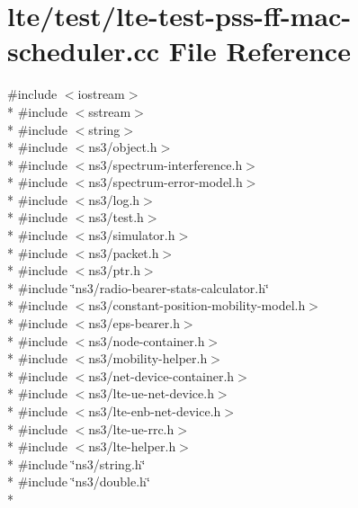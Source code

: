 \hypertarget{lte-test-pss-ff-mac-scheduler_8cc}{}\section{lte/test/lte-\/test-\/pss-\/ff-\/mac-\/scheduler.cc File Reference}
\label{lte-test-pss-ff-mac-scheduler_8cc}
{\ttfamily \#include $<$iostream$>$}\\*
{\ttfamily \#include $<$sstream$>$}\\*
{\ttfamily \#include $<$string$>$}\\*
{\ttfamily \#include $<$ns3/object.\+h$>$}\\*
{\ttfamily \#include $<$ns3/spectrum-\/interference.\+h$>$}\\*
{\ttfamily \#include $<$ns3/spectrum-\/error-\/model.\+h$>$}\\*
{\ttfamily \#include $<$ns3/log.\+h$>$}\\*
{\ttfamily \#include $<$ns3/test.\+h$>$}\\*
{\ttfamily \#include $<$ns3/simulator.\+h$>$}\\*
{\ttfamily \#include $<$ns3/packet.\+h$>$}\\*
{\ttfamily \#include $<$ns3/ptr.\+h$>$}\\*
{\ttfamily \#include \char`\"{}ns3/radio-\/bearer-\/stats-\/calculator.\+h\char`\"{}}\\*
{\ttfamily \#include $<$ns3/constant-\/position-\/mobility-\/model.\+h$>$}\\*
{\ttfamily \#include $<$ns3/eps-\/bearer.\+h$>$}\\*
{\ttfamily \#include $<$ns3/node-\/container.\+h$>$}\\*
{\ttfamily \#include $<$ns3/mobility-\/helper.\+h$>$}\\*
{\ttfamily \#include $<$ns3/net-\/device-\/container.\+h$>$}\\*
{\ttfamily \#include $<$ns3/lte-\/ue-\/net-\/device.\+h$>$}\\*
{\ttfamily \#include $<$ns3/lte-\/enb-\/net-\/device.\+h$>$}\\*
{\ttfamily \#include $<$ns3/lte-\/ue-\/rrc.\+h$>$}\\*
{\ttfamily \#include $<$ns3/lte-\/helper.\+h$>$}\\*
{\ttfamily \#include \char`\"{}ns3/string.\+h\char`\"{}}\\*
{\ttfamily \#include \char`\"{}ns3/double.\+h\char`\"{}}\\*

